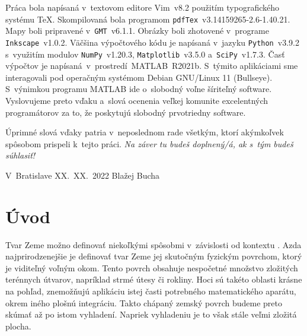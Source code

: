 \documentclass[a4paper,12pt]{book}
\begin{document}
Práca bola napísaná v~textovom editore Vim~v8.2 použitím typografického systému
\TeX.  Skompilovaná bola programom \texttt{pdfTex}~v3.14159265-2.6-1.40.21.
Mapy boli pripravené v~\texttt{GMT}~v6.1.1.  Obrázky boli zhotovené v~programe
\texttt{Inkscape}~v1.0.2.  Väčšina výpočtového kódu je napísaná
v~jazyku \texttt{Python}~v3.9.2 s~využitím modulov
\texttt{NumPy}~v1.20.3, \texttt{Matplotlib}~v3.5.0 a~\texttt{SciPy}~v1.7.3.
Časť výpočtov je napísaná~v~prostredí~MATLAB~R2021b.
S~týmito aplikáciami sme interagovali pod operačným systémom Debian GNU/Linux
11 (Bullseye).  S~výnimkou programu MATLAB ide o~slobodný voľne šíriteľný
software.  Vyslovujeme preto vďaku a~slová ocenenia veľkej komunite
excelentných programátorov za to, že poskytujú slobodný prvotriedny software.

Úprimné slová vďaky patria v~neposlednom rade všetkým, ktorí akýmkoľvek
spôsobom prispeli k~tejto práci. \emph{Na záver tu budeš doplnený/á, ak s~tým
budeš súhlasiť!}


\vspace{4ex}

\noindent V~Bratislave XX.~XX.~2022 \hfill Blažej Bucha






\tableofcontents
\newpage







\chapter*{Úvod}
\label{sec:introduction}

Tvar Zeme možno definovať niekoľkými spôsobmi v~závislosti od kontextu 
\parencite{MoritzTheFigureOfTheEarth}.  Azda najprirodzenejšie je definovať 
tvar Zeme jej skutočným fyzickým povrchom, ktorý je viditeľný voľným okom.  
Tento povrch obsahuje nespočetné množstvo zložitých terénnych útvarov, 
napríklad strmé útesy či rokliny.  Hoci sú takéto oblasti krásne na pohľad, 
znemožňujú aplikáciu istej časti potrebného matematického aparátu, okrem iného 
plošnú integráciu.  Takto chápaný zemský povrch budeme preto skúmať až po istom 
vyhladení.  Napriek vyhladeniu je to však stále veľmi zložitá plocha.
\end{document}
